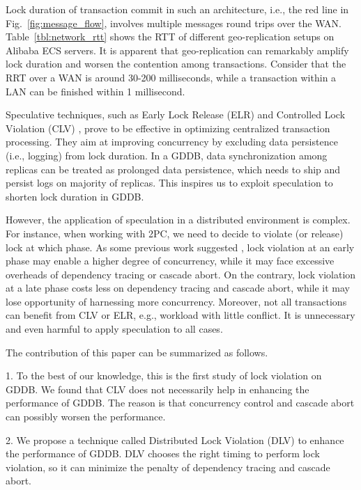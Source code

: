\documentclass[conference]{IEEEtran}
\begin{document}
Lock duration of transaction commit in such an architecture, i.e., the red line in Fig.~\ref{fig:message_flow}, involves multiple messages round trips over the WAN.
Table~\ref{tbl:network_rtt} shows the RTT of different geo-replication setups on Alibaba ECS servers.
It is apparent that geo-replication can remarkably amplify lock duration and worsen the contention among transactions.
Consider that the RRT over a WAN is around 30-200 milliseconds, while a transaction within a LAN can be finished within 1 millisecond.

Speculative techniques, such as Early Lock Release (ELR) \cite{EfficientLocking:conf/vldb/KimuraGK12} and Controlled Lock Violation (CLV)
\cite{CLV:conf/sigmod/GraefeLKTV13}, prove to be effective in optimizing centralized transaction processing.
They aim at improving concurrency by excluding data persistence (i.e., logging) from lock duration.
In a GDDB, data synchronization among replicas can be treated as prolonged data persistence, which needs to ship and persist logs on majority of replicas.
This inspires us to exploit speculation to shorten lock duration in GDDB.

However, the application of speculation in a distributed environment is complex.
For instance, when working with 2PC, we need to decide to violate (or release) lock at which phase.
As some previous work suggested \cite{CLV:conf/sigmod/GraefeLKTV13}, lock violation at an early phase may enable a higher degree of concurrency,
while it may face excessive overheads of dependency tracing or cascade abort.
On the contrary, lock violation at a late phase costs less on dependency tracing and cascade abort,
while it may lose opportunity of harnessing more concurrency.
Moreover, not all transactions can benefit from CLV or ELR, e.g., workload with little conflict.
It is unnecessary and even harmful to apply speculation to all cases.

The contribution of this paper can be summarized as follows.

1. To the best of our knowledge, this is the first study of lock violation on GDDB.
We found that CLV does not necessarily help in enhancing the performance of GDDB.
The reason is that concurrency control and cascade abort can possibly worsen the performance.

2. We propose a technique called Distributed Lock Violation (DLV) to enhance the performance of GDDB.
DLV chooses the right timing to perform lock violation, so it can minimize the penalty of dependency tracing and cascade abort.
\end{document}

